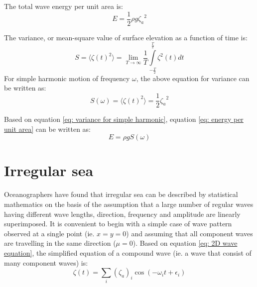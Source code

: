 The total wave energy per unit area is:
\begin{equation}
  E = \frac{1}{2} \rho g {\zeta_a}^2
  \label{eq: energy per unit area}
\end{equation}

The variance, or mean-square value of surface elevation as a function of time
is:
\begin{equation}
  S = 
  \langle\zeta (t)^2 \rangle = 
  \lim_{T \to \infty} 
  \frac{1}{T} 
  \int\limits_{-\frac{T}{2}}^{\frac{T}{2}} 
  \zeta^2(t) dt
  \label{eq: variance}
\end{equation}
For simple harmonic motion of frequency $\omega$, the above equation for 
variance can be written as:
\begin{equation}
  S(\omega) = 
  \langle\zeta (t)^2 \rangle = 
  \frac{1}{2} {\zeta_a}^2
  \label{eq: variance for simple harmonic}
\end{equation}

Based on equation \ref{eq: variance for simple harmonic}, equation 
\ref{eq: energy per unit area} can be written as:
\begin{equation}
  E = \rho g S(\omega)
\end{equation}


\section{Irregular sea}

Oceanographers have found that irregular sea can be described by statistical
mathematics on the basis of the assumption that a large number of regular waves
having different wave lengths, direction, frequency and amplitude are linearly
superimposed. It is convenient to begin with a simple case of wave pattern
observed at a single point (ie. $x = y = 0$) and assuming that all component
waves are travelling in the same direction ($\mu = 0$). Based on equation 
\ref{eq: 2D wave equation}, the simplified equation of a compound wave (ie. a 
wave that consist of many component waves) is:
\begin{equation}
  \zeta(t) = \sum _{i} (\zeta_a)_i \cos(-\omega_i t + \epsilon_i)
  \label{eq: 2D irregular wave equation}
\end{equation}

